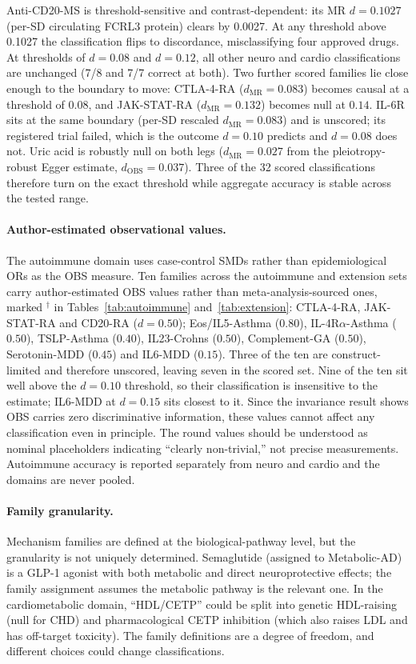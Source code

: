 \documentclass[11pt]{article}
\begin{document}
Anti-CD20-MS is threshold-sensitive and contrast-dependent: its MR $d = 0.1027$ (per-SD circulating FCRL3 protein) clears by 0.0027. At any threshold above 0.1027 the classification flips to discordance, misclassifying four approved drugs. At thresholds of $d = 0.08$ and $d = 0.12$, all other neuro and cardio classifications are unchanged (7/8 and 7/7 correct at both). Two further scored families lie close enough to the boundary to move: CTLA-4-RA ($d_{\text{MR}} = 0.083$) becomes causal at a threshold of $0.08$, and JAK-STAT-RA ($d_{\text{MR}} = 0.132$) becomes null at $0.14$. IL-6R sits at the same boundary (per-SD rescaled $d_{\text{MR}} = 0.083$) and is unscored; its registered trial failed, which is the outcome $d = 0.10$ predicts and $d = 0.08$ does not. Uric acid is robustly null on both legs ($d_{\text{MR}} = 0.027$ from the pleiotropy-robust Egger estimate, $d_{\text{OBS}} = 0.037$). Three of the 32 scored classifications therefore turn on the exact threshold while aggregate accuracy is stable across the tested range.

\paragraph{Author-estimated observational values.} The autoimmune domain uses case-control SMDs rather than epidemiological ORs as the OBS measure. Ten families across the autoimmune and extension sets carry author-estimated OBS values rather than meta-analysis-sourced ones, marked $^\dagger$ in Tables~\ref{tab:autoimmune} and~\ref{tab:extension}: CTLA-4-RA, JAK-STAT-RA and CD20-RA ($d = 0.50$); Eos/IL5-Asthma ($0.80$), IL-4R$\alpha$-Asthma ($0.50$), TSLP-Asthma ($0.40$), IL23-Crohns ($0.50$), Complement-GA ($0.50$), Serotonin-MDD ($0.45$) and IL6-MDD ($0.15$). Three of the ten are construct-limited and therefore unscored, leaving seven in the scored set. Nine of the ten sit well above the $d = 0.10$ threshold, so their classification is insensitive to the estimate; IL6-MDD at $d = 0.15$ sits closest to it. Since the invariance result shows OBS carries zero discriminative information, these values cannot affect any classification even in principle. The round values should be understood as nominal placeholders indicating ``clearly non-trivial,'' not precise measurements. Autoimmune accuracy is reported separately from neuro and cardio and the domains are never pooled.

\paragraph{Family granularity.} Mechanism families are defined at the biological-pathway level, but the granularity is not uniquely determined. Semaglutide (assigned to Metabolic-AD) is a GLP-1 agonist with both metabolic and direct neuroprotective effects; the family assignment assumes the metabolic pathway is the relevant one. In the cardiometabolic domain, ``HDL/CETP'' could be split into genetic HDL-raising (null for CHD) and pharmacological CETP inhibition (which also raises LDL and has off-target toxicity). The family definitions are a degree of freedom, and different choices could change classifications.
\end{document}

